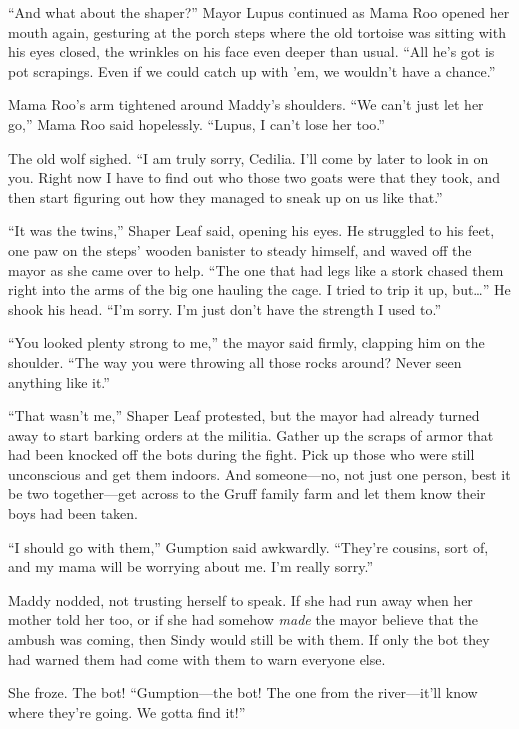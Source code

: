\documentclass[10pt]{article}
\begin{document}
``And what about the shaper?'' Mayor Lupus continued as Mama Roo opened
her mouth again, gesturing at the porch steps where the old tortoise was
sitting with his eyes closed, the wrinkles on his face even deeper than
usual. ``All he's got is pot scrapings. Even if we could catch up with
'em, we wouldn't have a chance.''

Mama Roo's arm tightened around Maddy's shoulders. ``We can't just let
her go,'' Mama Roo said hopelessly. ``Lupus, I can't lose her too.''

The old wolf sighed. ``I am truly sorry, Cedilia. I'll come by later to
look in on you. Right now I have to find out who those two goats were
that they took, and then start figuring out how they managed to sneak up
on us like that.''

``It was the twins,'' Shaper Leaf said, opening his eyes. He struggled
to his feet, one paw on the steps' wooden banister to steady himself,
and waved off the mayor as she came over to help. ``The one that had
legs like a stork chased them right into the arms of the big one hauling
the cage. I tried to trip it up, but\ldots{}'' He shook his head. ``I'm
sorry. I'm just don't have the strength I used to.''

``You looked plenty strong to me,'' the mayor said firmly, clapping him
on the shoulder. ``The way you were throwing all those rocks around?
Never seen anything like it.''

``That wasn't me,'' Shaper Leaf protested, but the mayor had already
turned away to start barking orders at the militia. Gather up the scraps
of armor that had been knocked off the bots during the fight. Pick up
those who were still unconscious and get them indoors. And someone---no,
not just one person, best it be two together---get across to the Gruff
family farm and let them know their boys had been taken.

``I should go with them,'' Gumption said awkwardly. ``They're cousins,
sort of, and my mama will be worrying about me. I'm really sorry.''

Maddy nodded, not trusting herself to speak. If she had run away when
her mother told her too, or if she had somehow \emph{made} the mayor
believe that the ambush was coming, then Sindy would still be with them.
If only the bot they had warned them had come with them to warn everyone
else.

She froze. The bot! ``Gumption---the bot! The one from the river---it'll
know where they're going. We gotta find it!''
\end{document}
